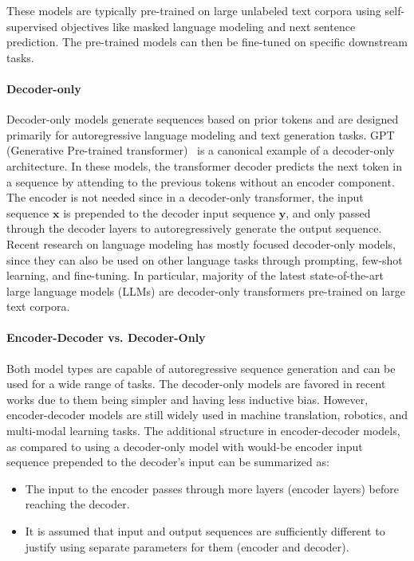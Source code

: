 These models are typically pre-trained on large unlabeled text corpora using self-supervised objectives like masked language modeling and next sentence prediction. The pre-trained models can then be fine-tuned on specific downstream tasks.

\paragraph{Decoder-only}
Decoder-only models generate sequences based on prior tokens and are designed primarily for autoregressive language modeling and text generation tasks. GPT (Generative Pre-trained transformer)~\cite{radford_improving_2018} is a canonical example of a decoder-only architecture. In these models, the transformer decoder predicts the next token in a sequence by attending to the previous tokens without an encoder component. The encoder is not needed since in a decoder-only transformer, the input sequence $\mathbf{x}$ is prepended to the decoder input sequence $\mathbf{y}$, and only passed through the decoder layers to autoregressively generate the output sequence. Recent research on language modeling has mostly focused decoder-only models, since they can also be used on other language tasks through prompting, few-shot learning, and fine-tuning. In particular, majority of the latest state-of-the-art large language models (LLMs) are decoder-only transformers pre-trained on large text corpora.

\paragraph{Encoder-Decoder vs. Decoder-Only} Both model types are capable of autoregressive sequence generation and can be used for a wide range of tasks. The decoder-only models are favored in recent works due to them being simpler and having less inductive bias. However, encoder-decoder models are still widely used in machine translation, robotics, and multi-modal learning tasks. The additional structure in encoder-decoder models, as compared to using a decoder-only model with would-be encoder input sequence prepended to the decoder's input can be summarized as:
\begin{itemize}
    \item The input to the encoder passes through more layers (encoder layers) before reaching the decoder.
    \item It is assumed that input and output sequences are sufficiently different to justify using separate parameters for them (encoder and decoder).
\end{itemize}

